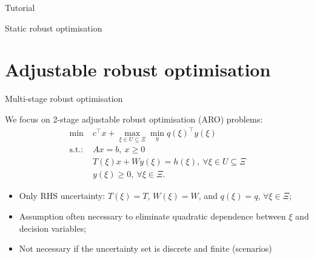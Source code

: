 \begin{frame}{Tutorial}

\centering
\bf
\large

Static robust optimisation
	
\end{frame}


\section{Adjustable robust optimisation}


\begin{frame}{Multi-stage robust optimisation}

	We focus on \alert{2-stage adjustable robust optimisation} (ARO) problems:
	\begin{equation} \tag{ARO}
	\begin{aligned}
		\min~  & c^\top x + \max_{\xi \in U \subseteq \Xi} \min_y q(\xi)^\top y(\xi) \\
		\text{s.t.:~}  & Ax = b, \ x \ge 0 \\
			   & T(\xi)x + Wy(\xi) = h(\xi), \ \forall \xi \in U \subseteq \Xi \\
			   & y(\xi) \ge 0, \ \forall \xi \in \Xi.
	\end{aligned}
	\end{equation}
	\pause
	\vspace{-6pt}
	\begin{itemize}
		\item Only \alert{RHS} uncertainty: $T(\xi) = T$, $W(\xi) = W$, and $q(\xi) = q$, $\forall \xi \in \Xi$;
		\item Assumption often necessary to eliminate \alert{quadratic} dependence between $\xi$ and decision variables;
		\item Not necessary if the uncertainty set is \alert{discrete} and \alert{finite} (scenarios)
	\end{itemize}



	
\end{frame}


